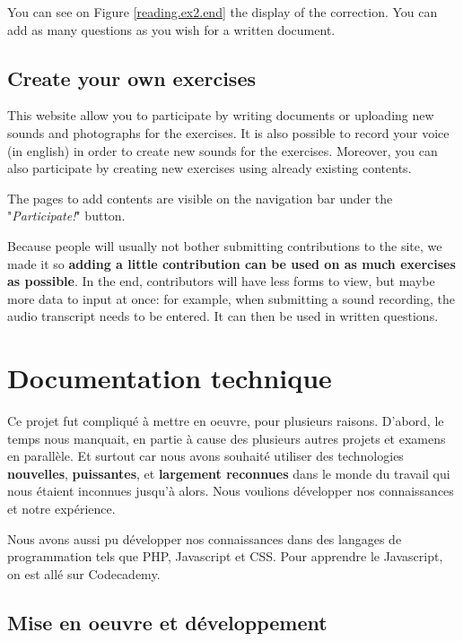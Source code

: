 \documentclass[12pt,a4paper]{report}
\begin{document}
You can see on Figure \ref{reading.ex2.end} the display of the correction. You
can add as many questions as you wish for a written document.


\subsection{Create your own exercises}

This website allow you to participate by writing documents or uploading new
sounds and photographs for the exercises. It is also possible to record your
voice (in english) in order to create new sounds for the exercises. Moreover,
you can also participate by creating new exercises using already existing
contents.

The pages to add contents are visible on the navigation bar
under the "\textit{Participate!}" button.

Because people will usually not bother submitting contributions to the site, we made it so \textbf{adding a little contribution can be used on as much exercises as possible}. In the end, contributors will have less forms to view, but maybe more data to input at once: for example, when submitting a sound recording, the audio transcript needs to be entered. It can then be used in written questions.

\pagebreak

\section{Documentation technique}

Ce projet fut compliqué à mettre en oeuvre, pour plusieurs raisons. D'abord, le temps nous manquait, en partie à cause des plusieurs autres projets et examens en parallèle. Et surtout car nous avons souhaité utiliser des technologies \textbf{nouvelles}, \textbf{puissantes}, et \textbf{largement reconnues} dans le monde du travail qui nous étaient inconnues jusqu'à alors. Nous voulions développer nos connaissances et notre expérience. 

Nous avons aussi pu développer nos connaissances dans des langages de
programmation tels que PHP\cite{php}, Javascript\cite{javascript} et
CSS\cite{css}. Pour apprendre le Javascript, on est allé sur Codecademy\cite{codecademy}.




\subsection{Mise en oeuvre et développement}
\end{document}
